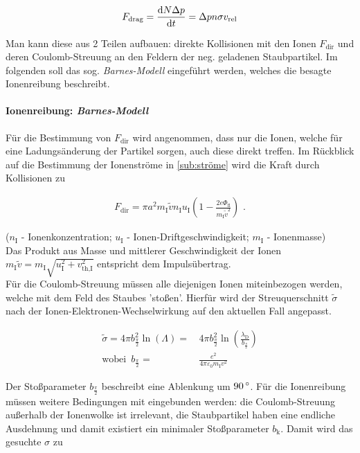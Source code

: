 \documentclass[numbers=noenddot,a4paper]{scrartcl}
\newcommand{\degree}{^\circ}
\newcommand{\diff}{\textnormal{d}}
\newcommand{\ix}[1]{_\text{#1}}
\newcommand{\tilt}[1]{\textit{#1}}
\begin{document}
				\begin{align}
					F\ix{drag}=\frac{\diff N \Delta p}{\diff t}=\Delta p n \sigma v\ix{rel}
				\end{align}

			 Man kann diese aus 2 Teilen aufbauen: direkte Kollisionen mit den Ionen $F\ix{dir}$ und deren Coulomb-Streuung an den Feldern der neg. geladenen Staubpartikel. Im folgenden soll das sog. \tilt{Barnes-Modell} eingeführt werden, welches die besagte Ionenreibung beschreibt.

				\paragraph{Ionenreibung: \tilt{Barnes-Modell}}

				Für die Bestimmung von $F\ix{dir}$ wird angenommen, dass nur die Ionen, welche für eine Ladungsänderung der Partikel sorgen, auch diese direkt treffen. Im Rückblick auf die Bestimmung der Ionenströme in \ref{sub:ströme} wird die Kraft durch Kollisionen zu

					\begin{align}
						F\ix{dir}=\pi a^2m\ix{I}\tilde{v}n\ix{I}u\ix{I}\left(1-\frac{2e\Phi\ix{fl}}{m\ix{I}\tilde{v}^2}\right)\,\,.
					\end{align}

				($n\ix{I}$ - Ionenkonzentration; $u\ix{I}$ - Ionen-Driftgeschwindigkeit; $m\ix{I}$ - Ionenmasse)\\
				Das Produkt aus Masse und mittlerer Geschwindigkeit der Ionen $m\ix{I}\tilde{v}=m\ix{I}\sqrt{u\ix{I}^2+v\ix{th,I}^2}$ entspricht dem Impulsübertrag.\\
				Für die Coulomb-Streuung müssen alle diejenigen Ionen miteinbezogen werden, welche mit dem Feld des Staubes 'stoßen'. Hierfür wird der Streuquerschnitt $\tilde{\sigma}$ nach \cite{Barnes92} der Ionen-Elektronen-Wechselwirkung auf den aktuellen Fall angepasst.

					\begin{align}
						\tilde{\sigma}=4\pi b_{\frac{\pi}{2}}^2\ln\left(\Lambda\right)=&\,4\pi b_{\frac{\pi}{2}}^2\ln\left(\frac{\lambda\ix{D}}{b_{\frac{\pi}{2}}}\right) \\
						\text{wobei }\, b_{\frac{\pi}{2}}=&\,\frac{e^2}{4\pi\varepsilon\ix{0}m\ix{I}v^2} \nonumber
					\end{align}

				Der Stoßparameter $b_{\frac{\pi}{2}}$ beschreibt eine Ablenkung um $\unit[90]{\degree}$. Für die Ionenreibung müssen weitere Bedingungen mit eingebunden werden: die Coulomb-Streuung außerhalb der Ionenwolke ist irrelevant, die Staubpartikel haben eine endliche Ausdehnung und damit existiert ein minimaler Stoßparameter $b\ix{k}$. Damit wird das gesuchte $\sigma$ zu
\end{document}
